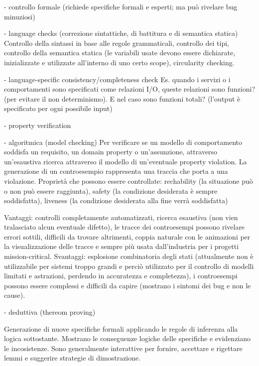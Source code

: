 - controllo formale (richiede specifiche formali e esperti; ma può rivelare bug minuziosi)
 
 - language checks (correzione sintattiche, di battitura e di semantica statica)
   Controllo della sintassi in base alle regole grammaticali, controllo dei tipi, controllo della semantica statica (le variabili usate devono essere dichiarate,  inizializzate e utilizzate all’interno di uno certo scope), circularity checking.
 
 - language-specific consistency/completeness check 
   Es. quando i servizi o i comportamenti sono specificati come relazioni I/O, queste relazioni sono funzioni? (per evitare il non determinismo). E nel caso sono funzioni totali? (l’output è specificato per ogni possibile input)
 
 - property verification
   
   - algoritmica (model checking)
     Per verificare se un modello di comportamento soddisfa un requisito, un domain property o un’assunzione, attraverso un’esaustiva ricerca attraverso il modello di un’eventuale property violation.
     La generazione di un controesempio rappresenta una traccia che porta a una violazione.
     Proprietà che possono essere controllate: rechability (la situazione può o non può essere raggiunta), safety (la condizione desiderata è sempre soddisfatta), liveness (la condizione desiderata alla fine verrà soddisfatta)
     
     Vantaggi: controlli completamente automatizzati, ricerca esaustiva (non vien tralasciato alcun eventuale difetto), le tracce dei controesempi possono rivelare errori sottili, difficili da trovare altrimenti, coppia naturale con le animazioni per la visualizzazione delle tracce e sempre più usata dall’industria per i progetti mission-critical.
     Svantaggi: esplosione combinatoria degli stati (attualmente non è utilizzabile per sistemi troppo grandi e perciò utilizzato per il controllo di modelli limitati e astrazioni, perdendo in accuratezza e completezza), i controesempi possono essere complessi e difficili da capire (mostrano i sintomi dei bug e non le cause).
   
   - deduttiva (thereom proving)
     
     Generazione di nuove specifiche formali applicando le regole di inferenza alla logica sottostante.
     Mostrano le conseguenze logiche delle specifiche e evidenziano le incosistenze.
     Sono generalmente interattive per fornire, accettare e rigettare lemmi e suggerire strategie di dimostrazione.
     
